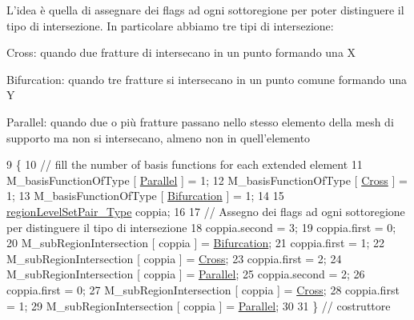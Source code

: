 L'idea è quella di assegnare dei flags ad ogni sottoregione per poter distinguere il tipo di intersezione. In particolare abbiamo tre tipi di intersezione\-:
\begin{DoxyItemize}
\item Cross\-: quando due fratture di intersecano in un punto formando una X
\item Bifurcation\-: quando tre fratture si intersecano in un punto comune formando una Y
\item Parallel\-: quando due o più fratture passano nello stesso elemento della mesh di supporto ma non si intersecano, almeno non in quell'elemento
\end{DoxyItemize}
\begin{DoxyCode}
9 \{
10     \textcolor{comment}{// fill the number of basis functions for each extended element}
11     M\_basisFunctionOfType [ \hyperlink{classFractureIntersect_a9a4e4a784fa4c8e359767ed543f89dc5ad91760e1506b52a828bc401490f7c92b}{Parallel} ] = 1; 
12     M\_basisFunctionOfType [ \hyperlink{classFractureIntersect_a9a4e4a784fa4c8e359767ed543f89dc5a743fef1af81c0e61412fafb9438b380e}{Cross} ] = 1;
13     M\_basisFunctionOfType [ \hyperlink{classFractureIntersect_a9a4e4a784fa4c8e359767ed543f89dc5a4d466b3d3de0af7e18732b6f765bb1af}{Bifurcation} ] = 1;
14 
15     \hyperlink{classFractureIntersect_aea039e89cb4b4314c25c7a362641f40e}{regionLevelSetPair\_Type} coppia;
16     
17     \textcolor{comment}{// Assegno dei flags ad ogni sottoregione per distinguere il tipo di intersezione}
18     coppia.second = 3;
19     coppia.first = 0;
20     M\_subRegionIntersection [ coppia ] = \hyperlink{classFractureIntersect_a9a4e4a784fa4c8e359767ed543f89dc5a4d466b3d3de0af7e18732b6f765bb1af}{Bifurcation};
21     coppia.first = 1;
22     M\_subRegionIntersection [ coppia ] = \hyperlink{classFractureIntersect_a9a4e4a784fa4c8e359767ed543f89dc5a743fef1af81c0e61412fafb9438b380e}{Cross};
23     coppia.first = 2;
24     M\_subRegionIntersection [ coppia ] = \hyperlink{classFractureIntersect_a9a4e4a784fa4c8e359767ed543f89dc5ad91760e1506b52a828bc401490f7c92b}{Parallel};
25     coppia.second = 2;
26     coppia.first = 0;
27     M\_subRegionIntersection [ coppia ] = \hyperlink{classFractureIntersect_a9a4e4a784fa4c8e359767ed543f89dc5a743fef1af81c0e61412fafb9438b380e}{Cross};
28     coppia.first = 1;
29     M\_subRegionIntersection [ coppia ] = \hyperlink{classFractureIntersect_a9a4e4a784fa4c8e359767ed543f89dc5ad91760e1506b52a828bc401490f7c92b}{Parallel};
30 
31 \} \textcolor{comment}{// costruttore}
\end{DoxyCode}


